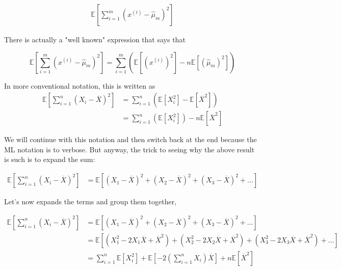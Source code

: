 \begin{align*}
\mathbb{E} \left[ \sum_{i=1}^{m} \left( x^{(i)} - \hat{\mu}_m \right)^2 \right]
\end{align*}

There is actually a "well known" expression that says that

$$
\mathbb{E} \left[ \sum_{i=1}^{m} \left( x^{(i)} - \hat{\mu}_m \right)^2 \right]
= \sum_{i=1}^{m} \left(
    \mathbb{E}\left[ \left( x^{(i)} \right)^2 \right]
    - n \mathbb{E}\left[ \left(\hat{\mu}_m  \right)^2 \right]
\right)
$$

In more conventional notation, this is written as
\begin{align*}
\mathbb{E} \left[ \sum_{i=1}^{n} \left( X_i - \overline{X} \right)^2 \right]
&= \sum_{i=1}^{n} \left( \mathbb{E}\left[ X_{i}^{2} \right] - \mathbb{E}\left[ \overline{X}^2 \right] \right) \\
&= \sum_{i=1}^{n} \left( \mathbb{E}\left[ X_{i}^{2} \right] \right)
    -n \mathbb{E}\left[ \overline{X}^2 \right]
\end{align*}

We will continue with this notation and then switch back at the end because the ML notation is to verbose.
But anyway, the trick to seeing why the above result is such is to expand the sum:

\begin{align*}
\mathbb{E} \left[ \sum_{i=1}^{n} \left( X_i - \overline{X} \right)^2 \right]
    &= \mathbb{E}\left[ \left(X_1 - \overline{X}\right)^2 + \left(X_2 - \overline{X}\right)^2 + \left(X_3 - \overline{X}\right)^2 + \dots \right]
\end{align*}

Let's now expands the terms and group them together,

\begin{align*}
\mathbb{E} \left[ \sum_{i=1}^{n} \left( X_i - \overline{X} \right)^2 \right]
    &= \mathbb{E}\left[ \left(X_1 - \overline{X}\right)^2 + \left(X_2 - \overline{X}\right)^2 + \left(X_3 - \overline{X}\right)^2 + \dots \right] \\
&= \mathbb{E} \left[ \left(X_{1}^{2} -2X_1 \overline{X} + \overline{X}^2 \right) + \left(X_{2}^{2} -2X_2 \overline{X} + \overline{X}^2 \right) + \left(X_{3}^{2} -2X_3 \overline{X} + \overline{X}^2 \right) + \dots\right] \\
&= \sum_{i=1}^{n} \mathbb{E}\left[ X_{i}^2 \right]
    + \mathbb{E}\left[ -2 \left( \sum_{i=1}^{n} X_i \right) \overline{X} \right] 
    + n \mathbb{E}\left[ \overline{X}^2 \right]
\end{align*}


